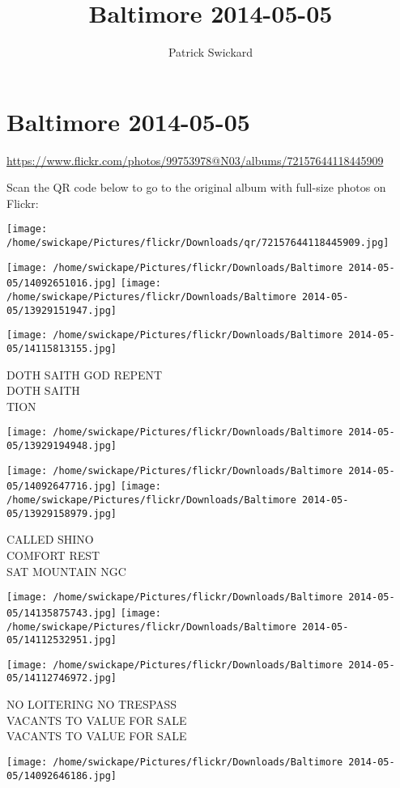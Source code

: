 \documentclass[10pt,letterpaper]{article}
\title{Baltimore 2014-05-05}
\author{Patrick Swickard}
\date{}
\begin{document}
\section*{Baltimore 2014-05-05}

\url{https://www.flickr.com/photos/99753978@N03/albums/72157644118445909}

Scan the QR code below to go to the original album with full-size photos on Flickr:

\texttt{[image: /home/swickape/Pictures/flickr/Downloads/qr/72157644118445909.jpg]}
\pagebreak

\texttt{[image: /home/swickape/Pictures/flickr/Downloads/Baltimore 2014-05-05/14092651016.jpg]}
\texttt{[image: /home/swickape/Pictures/flickr/Downloads/Baltimore 2014-05-05/13929151947.jpg]}

\texttt{[image: /home/swickape/Pictures/flickr/Downloads/Baltimore 2014-05-05/14115813155.jpg]}

DOTH SAITH GOD REPENT\\
DOTH SAITH\\
TION
\pagebreak

\texttt{[image: /home/swickape/Pictures/flickr/Downloads/Baltimore 2014-05-05/13929194948.jpg]}

\vspace{0.25in}
\texttt{[image: /home/swickape/Pictures/flickr/Downloads/Baltimore 2014-05-05/14092647716.jpg]}
\texttt{[image: /home/swickape/Pictures/flickr/Downloads/Baltimore 2014-05-05/13929158979.jpg]}

CALLED SHINO\\
COMFORT REST\\
SAT MOUNTAIN NGC
\pagebreak

\texttt{[image: /home/swickape/Pictures/flickr/Downloads/Baltimore 2014-05-05/14135875743.jpg]}
\texttt{[image: /home/swickape/Pictures/flickr/Downloads/Baltimore 2014-05-05/14112532951.jpg]}

\texttt{[image: /home/swickape/Pictures/flickr/Downloads/Baltimore 2014-05-05/14112746972.jpg]}

NO LOITERING NO TRESPASS\\
VACANTS TO VALUE FOR SALE\\
VACANTS TO VALUE FOR SALE
\pagebreak

\texttt{[image: /home/swickape/Pictures/flickr/Downloads/Baltimore 2014-05-05/14092646186.jpg]}
\end{document}
